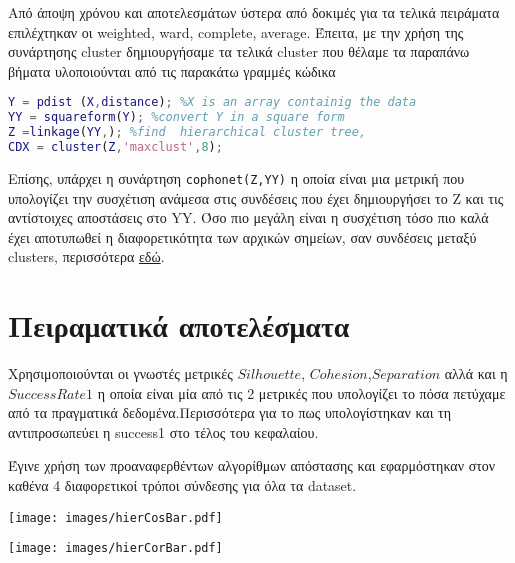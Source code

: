 Από άποψη χρόνου και αποτελεσμάτων ύστερα από δοκιμές για τα τελικά πειράματα επιλέχτηκαν οι weighted, ward, complete, average.
Έπειτα, με την χρήση της συνάρτησης cluster δημιουργήσαμε τα τελικά cluster που θέλαμε τα παραπάνω βήματα υλοποιούνται από τις παρακάτω γραμμές κώδικα 

\begin{lstlisting}[language=Matlab]
%simple example of hierarchical clustering
Y = pdist (X,distance); %X is an array containig the data
YY = squareform(Y); %convert Y in a square form
Z =linkage(YY,); %find  hierarchical cluster tree,
CDX = cluster(Z,'maxclust',8);
\end{lstlisting}

Επίσης, υπάρχει η συνάρτηση \lstinline!cophonet(Z,YY)! η οποία είναι μια μετρική που υπολογίζει την συσχέτιση ανάμεσα στις συνδέσεις που έχει δημιουργήσει το Z και τις αντίστοιχες αποστάσεις στο YY.
Όσο πιο μεγάλη είναι η συσχέτιση τόσο πιο καλά έχει αποτυπωθεί η διαφορετικότητα των αρχικών σημείων, σαν συνδέσεις μεταξύ clusters, περισσότερα
\href{https://en.wikipedia.org/wiki/Cophenetic_correlation}{εδώ}.

\section{Πειραματικά αποτελέσματα}
Χρησιμοποιούνται οι γνωστές μετρικές $Silhouette$, $Cohesion$,$Separation$
αλλά και η $Success Rate 1$ η οποία είναι μία από τις 2 μετρικές που  υπολογίζει το πόσα πετύχαμε από τα πραγματικά δεδομένα.Περισσότερα για το πως υπολογίστηκαν και τη αντιπροσωπεύει η success1 στο τέλος του κεφαλαίου.    

Έγινε χρήση των προαναφερθέντων αλγορίθμων απόστασης και εφαρμόστηκαν στον καθένα 4 διαφορετικοί τρόποι σύνδεσης για όλα τα dataset.

\noindent\begin{minipage}{\linewidth}
    \centering
    \texttt{[image: images/hierCosBar.pdf]}
    \label{fig:CosineHier}
\end{minipage}

\noindent\begin{minipage}{\linewidth}
    \centering
    \texttt{[image: images/hierCorBar.pdf]}
    \label{fig:hierCorBar}
\end{minipage}

